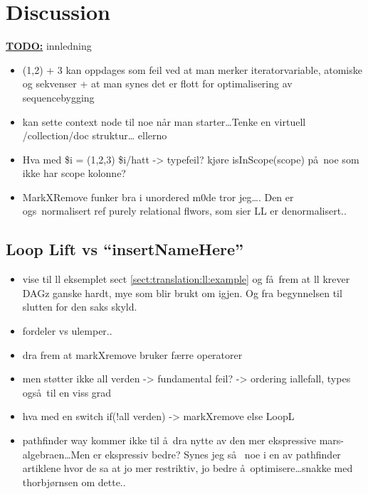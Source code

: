 \chapter{Discussion}
\label{chapter:discussion}

\textbf{\underline{\LARGE TODO:}} innledning

\begin{itemize}
  \item (1,2) + 3 kan oppdages som feil ved at man merker iteratorvariable, atomiske og sekvenser + at man synes
  det er flott for optimalisering av sequencebygging
  \item kan sette context node til noe n\aa r man starter\ldots Tenke en virtuell /collection/doc struktur\ldots
  ellerno
	\item Hva med \$i = (1,2,3) \$i/hatt -> typefeil? kj\o re isInScope(scope) p\aa~noe som ikke har scope kolonne?
	\item MarkXRemove funker bra i unordered m0de tror jeg\ldots. Den er ogs\a~normalisert ref purely relational
	flwors, som sier LL er denormalisert..
\end{itemize}

\section{Loop Lift vs ``insertNameHere''}
\label{sect:discussion:llvsmXr}
\begin{itemize}
  \item vise til ll eksemplet sect \ref{sect:translation:ll:example} og f\aa~frem at ll krever DAGz ganske hardt,
  mye som blir brukt om igjen. Og fra begynnelsen til slutten for den saks skyld.
  \item fordeler vs ulemper..
  \item dra frem at markXremove bruker f\ae rre operatorer
  \item men st\o tter ikke all verden -> fundamental feil? -> ordering iallefall, types ogs\aa~til en viss grad
  \item hva med en switch if(!all verden) -> markXremove else LoopL
  \item pathfinder way kommer ikke til \aa~dra nytte av den mer ekspressive mars-algebraen\ldots Men er ekspressiv
	  bedre? Synes jeg s\aa~ noe i en av pathfinder artiklene hvor de sa at jo mer restriktiv, jo bedre
	  \aa~optimisere\ldots snakke med thorbj\o rnsen om dette..
\end{itemize}

